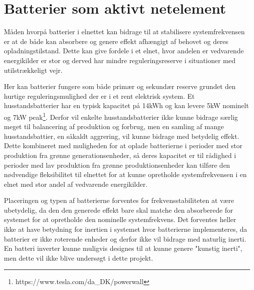\section{Batterier som aktivt netelement}

Måden hvorpå batterier i elnettet kan bidrage til at stabilisere systemfrekvensen er at de både kan absorbere og genere effekt afhængigt af behovet og deres opladningstilstand. Dette kan give fordele i et elnet, hvor andelen er vedvarende energikilder er stor og derved har mindre reguleringsreserve i situationer med utilstrækkeligt vejr.

Her kan batterier fungere som både primær og sekundær reserve grundet den hurtige reguleringsmulighed der er i et rent elektrisk system. Et husstandsbatterier har en typisk kapacitet på 14kWh og kan levere 5kW nominelt og 7kW peak\footnote{https://www.tesla.com/da\_DK/powerwall}. Derfor vil enkelte husstandsbatterier ikke kunne bidrage særlig meget til balancering af produktion og forbrug, men en samling af mange husstandsbattier, en såkaldt aggrering, vil kunne bidrage med betydelig effekt. Dette kombineret med muligheden for at oplade batterierne i perioder med stor produktion fra grønne generationsenheder, så deres kapacitet er til rådighed i perioder med lav produktion fra grønne produktionsenheder kan tilføre den nødvendige fleksibilitet til elnettet for at kunne opretholde systemfrekvensen i en elnet med stor andel af vedvarende energikilder.

Placeringen og typen af batterierne forventes for frekvensstabiliteten at være ubetydelig, da den den generede effekt bare skal matche den absorberede for systemet for at opretholde den nominelle systemfrekvens. Det forventes heller ikke at have betydning for inertien i systemet hvor batterierne implementeres, da batterier er ikke roterende enheder og derfor ikke vil bidrage med naturlig inerti. En batteri inverter kunne muligvis designes til at kunne genere "kunstig inerti", men dette vil ikke blive undersøgt i dette projekt.


